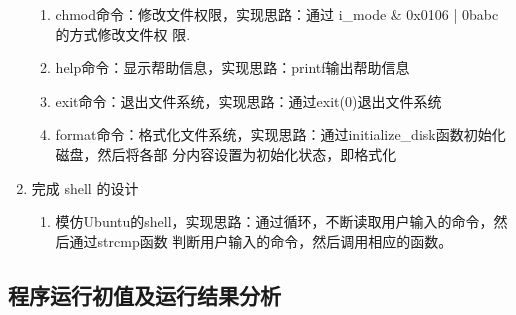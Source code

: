 \documentclass{article}
\begin{document}
\begin{enumerate}
\begin{enumerate}
            \item chmod命令：修改文件权限，实现思路：通过 i\_mode \& 0x0106 | 0babc 的方式修改文件权
            限.
            \item help命令：显示帮助信息，实现思路：printf输出帮助信息
            \item exit命令：退出文件系统，实现思路：通过exit(0)退出文件系统
            \item format命令：格式化文件系统，实现思路：通过initialize\_disk函数初始化磁盘，然后将各部
            分内容设置为初始化状态，即格式化
        \end{enumerate}
        \item 完成 shell 的设计
        \begin{enumerate}
            \item 模仿Ubuntu的shell，实现思路：通过循环，不断读取用户输入的命令，然后通过strcmp函数
            判断用户输入的命令，然后调用相应的函数。
        \end{enumerate}
    \end{enumerate}

    \subsection{程序运行初值及运行结果分析}
\end{document}
